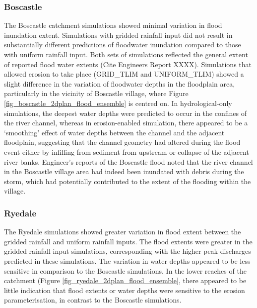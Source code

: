 \subsubsection{Boscastle}
The Boscastle catchment simulations showed minimal variation in flood inundation extent. Simulations with gridded rainfall input did not result in substantially different predictions of floodwater inundation compared to those with uniform rainfall input. Both sets of simulations reflected the general extent of reported flood water extents (Cite Engineers Report XXXX). Simulations that allowed erosion to take place (GRID\_TLIM and UNIFORM\_TLIM) showed a slight difference in the variation of floodwater depths in the floodplain area, particularly in the vicinity of Boscastle village, where Figure \ref{fig_boscastle_2dplan_flood_ensemble} is centred on. In hydrological-only simulations, the deepest water depths were predicted to occur in the confines of the river channel, whereas in erosion-enabled simulation, there appeared to be a `smoothing' effect of water depths between the channel and the adjacent floodplain, suggesting that the channel geometry had altered during the flood event either by infilling from sediment from upstream or collapse of the adjacent river banks. Engineer's reports of the Boscastle flood noted that the river channel in the Boscastle village area had indeed been inundated with debris during the storm, which had potentially contributed to the extent of the flooding within the village.

\subsubsection{Ryedale}
The Ryedale simulations showed greater variation in flood extent between the gridded rainfall and uniform rainfall inputs. The flood extents were greater in the gridded rainfall input simulations, corresponding with the higher peak discharges predicted in these simulations.  The variation in water depths appeared to be less sensitive in comparison to the Boscastle simulations. In the lower reaches of the catchment (Figure \ref{fig_ryedale_2dplan_flood_ensemble}, there appeared to be little indication that flood extents or water depths were sensitive to the erosion parameterisation, in contrast to the Boscastle simulations.



